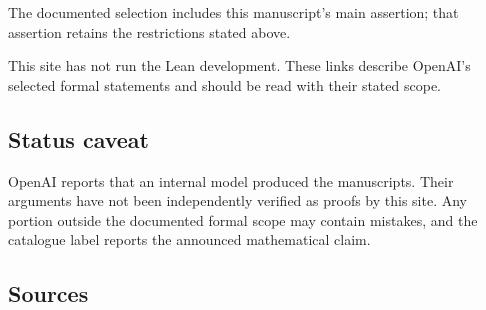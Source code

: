 \documentclass[11pt]{article}
\begin{document}
The documented selection includes this manuscript’s main assertion; that assertion retains the restrictions stated above.

This site has not run the Lean development. These links describe OpenAI’s selected formal statements and should be read with their stated scope.

\subsection{Status caveat}
OpenAI reports that an internal model produced the manuscripts. Their arguments have not been independently verified as proofs by this site. Any portion outside the documented formal scope may contain mistakes, and the catalogue label reports the announced mathematical claim.

\subsection{Sources}
\end{document}
